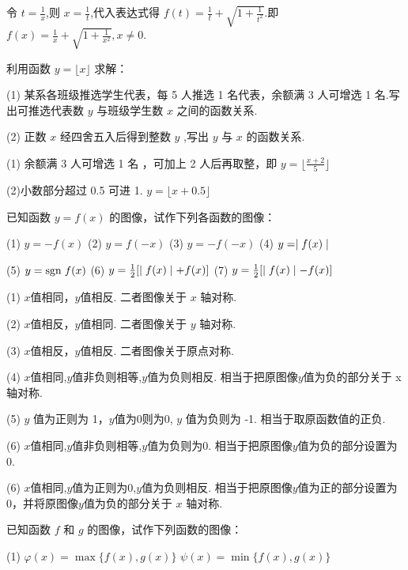 \begin{solve}
    令 $t=\frac{1}{x}$,则 $x=\frac{1}{t}$,代入表达式得 $f(t)=\frac{1}{t}+\sqrt{1+\frac{1}{t^2}}$.即 $f(x)=\frac{1}{x}+\sqrt{1+\frac{1}{x^2}},x\ne 0$.
\end{solve}

\begin{practice}
    利用函数 $y=\lfloor x \rfloor$ 求解：

    (1) 某系各班级推选学生代表，每 5 人推选 1 名代表，余额满 3 人可增选 1 名.写出可推选代表数 $y$ 与班级学生数 $x$ 之间的函数关系.

    (2) 正数 $x$ 经四舍五入后得到整数 $y$ ,写出 $y$ 与 $x$ 的函数关系.
\end{practice}

\begin{solve}
    (1) 余额满 3 人可增选 1 名 ，可加上 2 人后再取整，即 $y=\lfloor \frac{x+2}{5} \rfloor$

    (2)小数部分超过 0.5 可进 1.  $y=\lfloor x+0.5 \rfloor$
\end{solve}

\begin{practice}
    已知函数 $y=f(x)$ 的图像，试作下列各函数的图像：

    (1) $y=-f(x)$ \qquad (2) $y=f(-x)$ \qquad (3) $y=-f(-x)$ \qquad (4) $y=\mid f(x) \mid$ 

    (5) $y=\mbox{sgn}\hspace{3pt} f(x)$ \qquad (6) $y=\frac{1}{2} [\mid f(x) \mid+f(x)]$  \qquad (7) $y=\frac{1}{2} [\mid f(x) \mid-f(x)]$
\end{practice}

\begin{solve}
    (1) $x$值相同，$y$值相反. 二者图像关于 $x$ 轴对称.

    (2) $x$值相反，$y$值相同. 二者图像关于 $y$ 轴对称.

    (3) $x$值相反，$y$值相反. 二者图像关于原点对称.

    (4) $x$值相同,$y$值非负则相等,$y$值为负则相反. 相当于把原图像$y$值为负的部分关于 x 轴对称.

    (5) $y$ 值为正则为 1，$y$值为0则为0, $y$ 值为负则为 -1. 相当于取原函数值的正负.

    (6) $x$值相同,$y$值非负则相等,$y$值为负则为0. 相当于把原图像$y$值为负的部分设置为0.

    (6) $x$值相同,$y$值为正则为0,$y$值为负则相反. 相当于把原图像$y$值为正的部分设置为0，并将原图像$y$值为负的部分关于 $x$ 轴对称.
\end{solve}

\begin{practice}
    已知函数 $f$ 和 $g$ 的图像，试作下列函数的图像：

    (1) $\varphi(x)=\max\{f(x),g(x)\}$ \qquad $\psi(x)=\min\{f(x),g(x)\}$
\end{practice}

